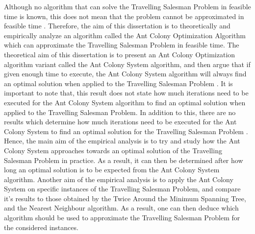 \documentclass[12pt]{article}
\numberwithin{equation}{subsection}
\numberwithin{table}{subsection}
\numberwithin{algorithm}{subsection}
\begin{document}
Although no algorithm that can solve the Travelling Salesman Problem in feasible time is known, this does not mean that the problem cannot be approximated in feasible time \cite{cormen_leiserson_rivest_stein}. Therefore, the aim of this dissertation is to theoretically and empirically analyze an algorithm called the Ant Colony Optimization Algorithm which can approximate the Travelling Salesman Problem in feasible time. The theoretical aim of this dissertation is to present an Ant Colony Optimization algorithm variant called the Ant Colony System algorithm, and then argue that if given enough time to execute, the Ant Colony System algorithm will always find an optimal solution when applied to the Travelling Salesman Problem \cite{dorigo_stutzle_thomas_2004}. It is important to note that, this result does not state how much iterations need to be executed for the  Ant Colony System algorithm to find an optimal solution when applied to the Travelling Salesman Problem. In addition to this, there are no results which determine how much iterations need to be executed for the Ant Colony System to find an optimal solution for the Travelling Salesman Problem \cite{dorigo_stutzle_thomas_2004}. Hence, the main aim of the empirical analysis is to try and study how the Ant Colony System approaches towards an optimal solution of the Travelling Salesman Problem in practice. As a result, it can then be determined after how long an optimal solution is to be expected from the Ant Colony System algorithm. Another aim of the empirical analysis is to apply the Ant Colony System on specific instances of the Travelling Salesman Problem, and compare it's results to those obtained by the Twice Around the Minimum Spanning Tree, and the Nearest Neighbour algorithm. As a result, one can then deduce which algorithm should be used to approximate the Travelling Salesman Problem for the considered instances. \\\\
\end{document}
